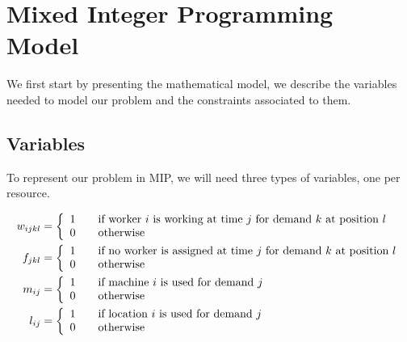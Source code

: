 \documentclass[../../thesis.tex]{subfiles}
\begin{document}
\section{Mixed Integer Programming Model}
\label{section:mipmodel}

We first start by presenting the mathematical model, we describe the variables
needed to model our problem and the constraints associated to them.

\subsection{Variables}

To represent our problem in MIP, we will need three types of variables, one per resource.



\begin{equation*}
\begin{split}
    w_{ijkl} &=  \left \{
                   \begin{array}{l l}
                      1 \quad & \textrm{if worker $i$ is working at time $j$ for demand $k$ at position $l$} \\
                      0 \quad & \textrm{otherwise} 
                   \end{array}
                   \right . \\
  f_{jkl} &=  \left \{
  \begin{array}{l l}
      1 \quad & \textrm{if no worker is assigned at time $j$ for demand $k$ at position $l$} \\
      0 \quad & \textrm{otherwise} 
  \end{array}
  \right . \\
   m_{ij} &=  \left \{
                   \begin{array}{l l}
                      1 \quad & \textrm{if machine $i$ is used for demand $j$} \\
                      0 \quad & \textrm{otherwise} 
                   \end{array}
                   \right . \\
    l_{ij} &= \left \{
               \begin{array}{l l}
                  1 \quad & \textrm{if location $i$ is used for demand $j$} \\
                  0 \quad & \textrm{otherwise} 
               \end{array}
               \right . \\
\end{split}
\end{equation*}
\end{document}
